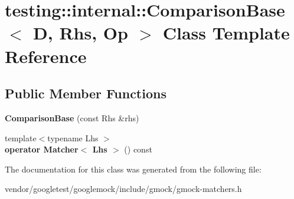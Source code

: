\hypertarget{classtesting_1_1internal_1_1_comparison_base}{}\section{testing\+:\+:internal\+:\+:Comparison\+Base$<$ D, Rhs, Op $>$ Class Template Reference}
\label{classtesting_1_1internal_1_1_comparison_base}
\subsection*{Public Member Functions}
\begin{DoxyCompactItemize}
\item 
\mbox{\label{classtesting_1_1internal_1_1_comparison_base_a365f20e35a604195c869ec0c0bc4c3a3}} 
{\bfseries Comparison\+Base} (const Rhs \&rhs)
\item 
\mbox{\label{classtesting_1_1internal_1_1_comparison_base_a071cdd47406c2e8df9c89bb99302eab9}} 
{\footnotesize template$<$typename Lhs $>$ }\\{\bfseries operator Matcher$<$ Lhs $>$} () const
\end{DoxyCompactItemize}


The documentation for this class was generated from the following file\+:\begin{DoxyCompactItemize}
\item 
vendor/googletest/googlemock/include/gmock/gmock-\/matchers.\+h\end{DoxyCompactItemize}
